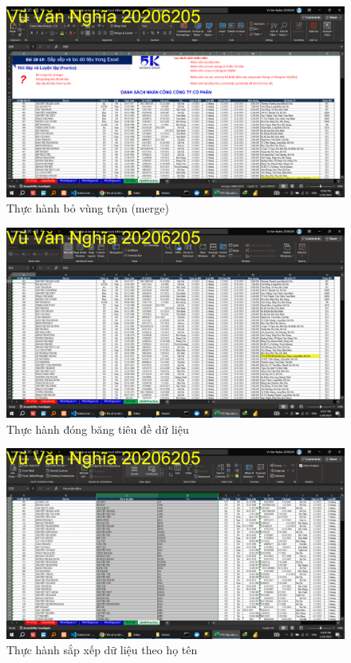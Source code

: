 \documentclass{article}
\begin{document}
\begin{figure}[h]
    \centering
    \includegraphics[scale = 0.15]{Video2/ThucHanh/0.png}
    \caption{Thực hành bỏ vùng trộn (merge)}
\end{figure}

\begin{figure}[h]
    \centering
    \includegraphics[scale = 0.15]{Video2/ThucHanh/1.png}
    \caption{Thực hành đóng băng tiêu đề dữ liệu}
\end{figure}

\begin{figure}[h]
    \centering
    \includegraphics[scale = 0.15]{Video2/ThucHanh/2.png}
    \caption{Thực hành sắp xếp dữ liệu theo họ tên}
\end{figure}
\end{document}
